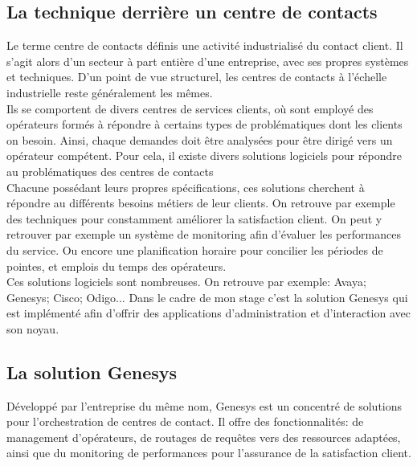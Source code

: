 \documentclass{rapport}
\begin{document}
\subsection{La technique derrière un centre de contacts}

Le terme centre de contacts définis une activité industrialisé du contact client. Il s'agit alors d'un secteur à part entière d'une entreprise, avec ses propres systèmes et techniques.
D'un point de vue structurel, les centres de contacts à l'échelle industrielle reste généralement les mêmes.\\

Ils se comportent de divers centres de services clients, où sont employé des opérateurs formés à répondre à certains types de problématiques dont les clients on besoin. Ainsi, chaque demandes doit être analysées pour être dirigé vers un opérateur compétent. Pour cela, il existe divers solutions logiciels pour répondre au problématiques des centres de contacts\\

Chacune possédant leurs propres spécifications, ces solutions cherchent à répondre au différents besoins métiers de leur clients.
On retrouve par exemple des techniques pour constamment améliorer la satisfaction client. On peut y retrouver par exemple un système de monitoring afin d'évaluer les performances du service. Ou encore une planification horaire pour concilier les périodes de pointes, et emplois du temps des opérateurs.\\

Ces solutions logiciels sont nombreuses. On retrouve par exemple:
Avaya; Genesys; Cisco; Odigo...
Dans le cadre de mon stage c'est la solution Genesys qui est implémenté afin d'offrir des applications d'administration et d'interaction avec son noyau.

\subsection{La solution Genesys}

Développé par l'entreprise du même nom, Genesys est un concentré de solutions pour l'orchestration de centres de contact. Il offre des fonctionnalités: de management d'opérateurs, de routages de requêtes vers des ressources adaptées, ainsi que du monitoring de performances pour l'assurance de la satisfaction client.\\

\end{document}
